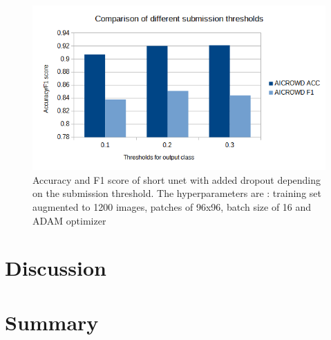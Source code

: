 \documentclass[10pt,conference,compsocconf]{IEEEtran}
\begin{document}
\begin{figure}[H]
    \centering
    \includegraphics[scale = 0.4]{thresholds_graph.png} %
    \caption{Accuracy and F1 score of short unet with added dropout depending on the submission threshold. The hyperparameters are : training set augmented to 1200 images, patches of 96x96, batch size of 16 and ADAM optimizer}
\end{figure}
\section{Discussion}

\section{Summary}



\end{document}
